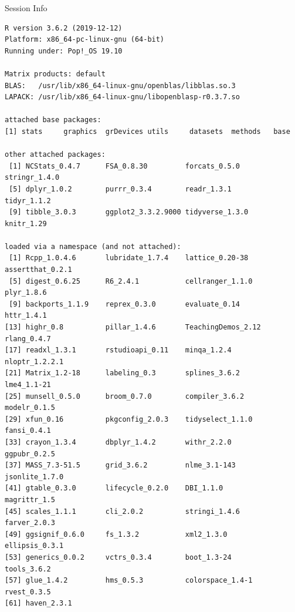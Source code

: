 \documentclass{beamer}\usepackage[]{graphicx}\usepackage[]{color}
\newenvironment{knitrout}{}{} %
\begin{document}


\begin{frame}[fragile]{Session Info}
	\tiny
	
\begin{knitrout}\tiny
{}\color{fgcolor}
\begin{verbatim}
R version 3.6.2 (2019-12-12)
Platform: x86_64-pc-linux-gnu (64-bit)
Running under: Pop!_OS 19.10

Matrix products: default
BLAS:   /usr/lib/x86_64-linux-gnu/openblas/libblas.so.3
LAPACK: /usr/lib/x86_64-linux-gnu/libopenblasp-r0.3.7.so

attached base packages:
[1] stats     graphics  grDevices utils     datasets  methods   base     

other attached packages:
 [1] NCStats_0.4.7      FSA_0.8.30         forcats_0.5.0      stringr_1.4.0     
 [5] dplyr_1.0.2        purrr_0.3.4        readr_1.3.1        tidyr_1.1.2       
 [9] tibble_3.0.3       ggplot2_3.3.2.9000 tidyverse_1.3.0    knitr_1.29        

loaded via a namespace (and not attached):
 [1] Rcpp_1.0.4.6       lubridate_1.7.4    lattice_0.20-38    assertthat_0.2.1  
 [5] digest_0.6.25      R6_2.4.1           cellranger_1.1.0   plyr_1.8.6        
 [9] backports_1.1.9    reprex_0.3.0       evaluate_0.14      httr_1.4.1        
[13] highr_0.8          pillar_1.4.6       TeachingDemos_2.12 rlang_0.4.7       
[17] readxl_1.3.1       rstudioapi_0.11    minqa_1.2.4        nloptr_1.2.2.1    
[21] Matrix_1.2-18      labeling_0.3       splines_3.6.2      lme4_1.1-21       
[25] munsell_0.5.0      broom_0.7.0        compiler_3.6.2     modelr_0.1.5      
[29] xfun_0.16          pkgconfig_2.0.3    tidyselect_1.1.0   fansi_0.4.1       
[33] crayon_1.3.4       dbplyr_1.4.2       withr_2.2.0        ggpubr_0.2.5      
[37] MASS_7.3-51.5      grid_3.6.2         nlme_3.1-143       jsonlite_1.7.0    
[41] gtable_0.3.0       lifecycle_0.2.0    DBI_1.1.0          magrittr_1.5      
[45] scales_1.1.1       cli_2.0.2          stringi_1.4.6      farver_2.0.3      
[49] ggsignif_0.6.0     fs_1.3.2           xml2_1.3.0         ellipsis_0.3.1    
[53] generics_0.0.2     vctrs_0.3.4        boot_1.3-24        tools_3.6.2       
[57] glue_1.4.2         hms_0.5.3          colorspace_1.4-1   rvest_0.3.5       
[61] haven_2.3.1       
\end{verbatim}

\end{knitrout}

\end{frame}
\end{document}
